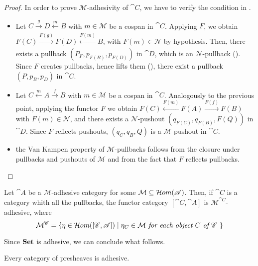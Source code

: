 \begin{proof}
    In order to prove $\mathcal M$-adhesivity of $\cat C$, we have to verify the condition in .
    \begin{itemize}
        \item Let $C \xrightarrow[]{g} D \xleftarrow[]{m} B$ with $m \in \mathcal M$ be a cospan in $\cat C$. Applying $F$, we obtain $F(C) \xrightarrow[]{F(g)} F(D) \xleftarrow[]{F(m)} B$, with $F(m) \in \mathcal{N}$ by hypothesis. Then, there exists a pullback $(P_F, p_{F(B)}, p_{F(D)})$ in $\cat D$, which is an $\mathcal N$-pullback (). Since $F$ creates pullbacks, hence lifts them (), there exist a pullback $(P, p_B, p_D)$ in $\cat C$.
        \item Let $C \xleftarrow{m} A \xrightarrow{f} B$ with $ m \in \mathcal M$ be a cospan in $\cat C$. Analogously to the previous point, applying the functor $F$ we obtain $F(C) \xleftarrow{F(m)} F(A) \xrightarrow{F(f)} F(B)$ with $ F(m) \in \mathcal N$, and there exists a $\mathcal N$-pushout $(q_{F(C)}, q_{F(B)}, F(Q))$ in $\cat D$. Since $F$ reflects pushouts, $(q_C, q_B, Q)$ is a $\mathcal{M}$-pushout in $\cat C$.
        \item the Van Kampen property of $\mathcal M$-pullbacks follows from the closure under pullbacks and pushouts of $\mathcal M$ and from the fact that $F$ reflects pullbacks.
    \end{itemize}
    
\end{proof}

\begin{cor}\label{cor:adhesivity_functor_categories}
    Let $\cat A$ be a $\mathcal M$-adhesive category for some $\mathcal M \subseteq \mathcal{H}om(\mathscr{A})$. Then, if $\cat C$ is a category whith all the pullbacks, the functor category $[\cat C, \cat A]$ is $\mathcal M^{\cat C}$-adhesive, where
    \[
        \mathcal{M}^{\mathscr{C}} = \{\eta \in \mathcal{H}om([\mathscr{C}, \mathscr{A}]) \mid \eta_C \in \mathcal M \textit{ for each object $C$ of $\mathscr{C}$ }\}
    \]
\end{cor}

Since $\mathbf{Set}$ is adhesive, we can conclude what follows.

\begin{cor}\label{cor:presh_adhesive}
    Every category of presheaves is adhesive.
\end{cor}



